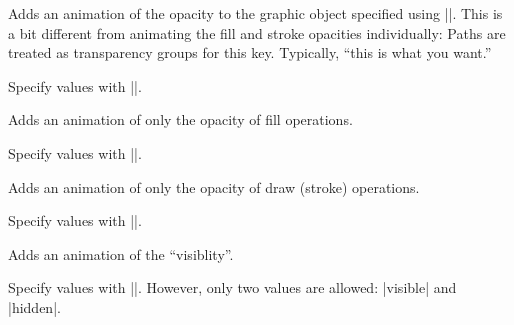 \begin{command}{\pgfsys@animateopacity}
  Adds an animation of the opacity to the graphic object specified
  using |\pgfsys@animation@whom|. This is a bit different from animating
  the fill and stroke opacities  individually: Paths are treated as
  transparency groups for this key. Typically, ``this is what you
  want.''
  
  Specify values with |\pgfsys@animation@scalar|.

\begin{codeexample}[width=2cm]
\end{codeexample}
\end{command}

\begin{command}{\pgfsys@animatefillopacity}
  Adds an animation of only the opacity of fill operations.
  
  Specify values with |\pgfsys@animation@scalar|.

\begin{codeexample}[width=2cm]
\end{codeexample}
\end{command}

\begin{command}{\pgfsys@animatestrokeopacity}
  Adds an animation of only the opacity of draw (stroke) operations.
  
  Specify values with |\pgfsys@animation@scalar|.
  
\begin{codeexample}[width=2cm]
\end{codeexample}
\end{command}

\begin{command}{\pgfsys@animatevisibility}
  Adds an animation of the ``visiblity''.
  
  Specify values with |\pgfsys@animation@text|. However, only two values are allowed:
  |visible| and |hidden|.
\begin{codeexample}[width=2cm]
\end{codeexample}
\end{command}


